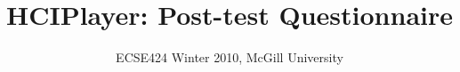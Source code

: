 \documentclass[10pt,letterpaper]{article}
\begin{document}
\title{HCIPlayer: Post-test Questionnaire}
\author{ECSE424 Winter 2010, McGill University}
\renewcommand{\today}{Updated: Monday, March 8th, 2010}
\maketitle

\begin{enumerate}

\end{enumerate}
\end{document}
